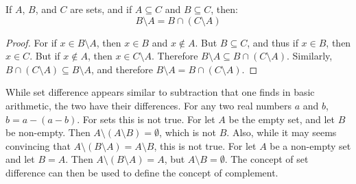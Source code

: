         \begin{theorem}
            \label{thm:MEASURE_THEORY_SET_DIFFERENCE_AS_INTERSECTION}
            If $A$, $B$, and $C$ are sets, and if $A\subseteq{C}$
            and $B\subseteq{C}$, then:
            \begin{equation}
                B\setminus{A}=B\cap(C\setminus{A})
            \end{equation}
        \end{theorem}
        \begin{proof}
            For if $x\in{B}\setminus{A}$, then
            $x\in{B}$ and $x\notin{A}$. But
            $B\subseteq{C}$, and thus if $x\in{B}$, then $x\in{C}$.
            But if $x\notin{A}$, then $x\in{C}\setminus{A}$. Therefore
            $B\setminus{A}\subseteq{B}\cap(C\setminus{A})$.
            Similarly, $B\cap(C\setminus{A})\subseteq{B}\setminus{A}$,
            and therefore $B\setminus{A}={B}\cap(C\setminus{A})$.
        \end{proof}
        While set difference appears similar to subtraction that one finds in
        basic arithmetic, the two have their differences. For any two real
        numbers $a$ and $b$, $b=a-(a-b)$. For sets this is not true. For let $A$
        be the empty set, and let $B$ be non-empty. Then
        $A\setminus(A\setminus{B})=\emptyset$, which is not $B$.
        Also, while it may seems convincing that
        $A\setminus(B\setminus{A})=A\setminus{B}$, this is not true. For
        let $A$ be a non-empty set and let $B=A$. Then
        $A\setminus(B\setminus{A})=A$, but $A\setminus{B}=\emptyset$.
        The concept of set difference can then be used to define the
        concept of complement.